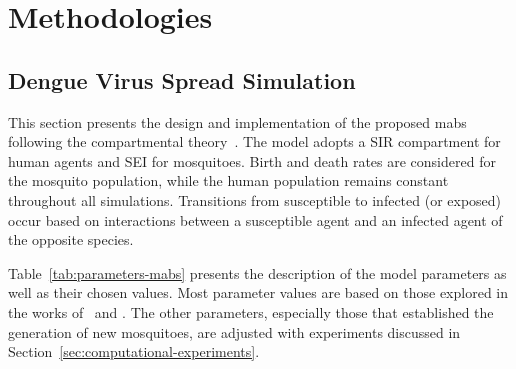 \chapter{Methodologies}\label{chap:methodologies}

\section{Dengue Virus Spread Simulation}\label{sec:dengue-virus-spread-simulation}

This section presents the design and implementation of the proposed \gls{mabs}
following the compartmental theory~\citep{amaku:2014}. The model adopts a SIR
compartment for human agents and SEI for mosquitoes. Birth and death rates are
considered for the mosquito population, while the human population remains
constant throughout all simulations. Transitions from susceptible to infected
(or exposed) occur based on interactions between a susceptible agent and an
infected agent of the opposite species.

Table~\ref{tab:parameters-mabs} presents the description of the model parameters
as well as their chosen values. Most parameter values are based on those
explored in the works of~\cite{da-silva:2020} and \cite{dwivedi:2022}. The other
parameters, especially those that established the generation of new mosquitoes,
are adjusted with experiments discussed in
Section~\ref{sec:computational-experiments}.

